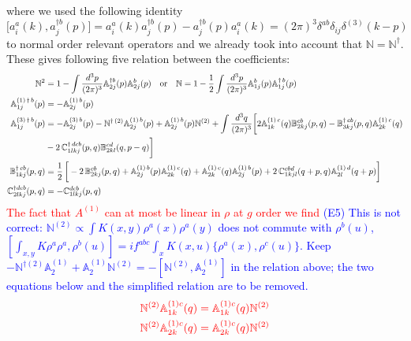 \documentclass[10pt]{article}
\def\mf#1{\mathbb{#1}}
\numberwithin{equation}{section}
\begin{document}
where we used the following identity
\begin{equation}
    \bigg[a^{a}_{i}(k),a^{\dagger b}_{j}(p)\bigg] = a^{a}_{i}(k)a^{\dagger b}_{j}(p) - a^{\dagger b}_{j}(p)a^{a}_{i}(k)= (2\pi)^{3}\delta^{ab}\delta_{ij}\delta^{(3)}(k-p)
\end{equation}
to normal order relevant operators and we  already took into account that $\mf{N} = \mf{N}^\dagger  $. These gives following five relation between the coefficients: 
\begin{align}
 \mf{N}^{2}  &= 1-  \int \frac{d^{3}p}{(2\pi)^{3}} \mf{A}^{\dagger b}_{2j}(p) \mf{A}^{b}_{2j}(p) \quad
 \text{or} \quad \mf{N}   = 1- \frac{1}{2} \int \frac{d^{3}p}{(2\pi)^{3}} \mf{A}^{b}_{1j}(p) \mf{A}^{\dagger\, b}_{1j}(p) \\ 
 \mf{A}^{(1)\, \dagger\,  b}_{1j}(p) & =  -\mf{A}^{(1)\, b}_{2j}(p) \\  
 \mf{A}^{(3)\, \dagger\, b}_{1j}(p) & = -\mf{A}^{(3)\, b}_{2j}(p)- \mf{N}^{\dagger\, (2)}\mf{A}^{(1)\, b}_{2j}(p) + \mf{A}^{(1)\, b}_{2j}(p)\mf{N}^{(2)} +\int \frac{d^{3}q}{(2\pi)^{3}}\bigg[2\mf{A}^{(1)\, c}_{1k}(q)\mf{B}^{cb}_{2kj}(p,q)-\mf{B}^{\dagger\, cb}_{3kj}(p,q)\mf{A}^{(1)\,c}_{2k}(q)\notag \\ & -2\,\mf{C}^{\dagger\, dcb}_{1lkj}(p,q)\mf{B}^{cd}_{2kl}(q,p-q)\bigg] \\ 
 \mf{B}^{\dagger\, cb}_{1kj}(p,q) & = \frac{1}{2}\,\bigg[-2\,\mf{B}^{cb}_{2kj}(p,q)+\mf{A}^{(1)\, b}_{2j}(p)\mf{A}^{(1)\, c}_{2k}(q)+ \mf{A}^{(1)\, c}_{2k}(q)\mf{A}^{(1)\, b}_{2j}(p)+2\, \mf{C}^{cbd}_{1kjl}(q+p,q)\mf{A}^{(1)\,d}_{2l}(q+p)\bigg]
\\ 
  \mf{C}^{\dagger dcb}_{2lkj}(p,q) & =  -\mf{C}^{dcb}_{1lkj}(p,q)
\end{align}
\textcolor{red}{The fact that $A^{(1)}$ can at most be linear in $\rho$ at $g$ order we find} \textcolor{blue}{(E5) This is not correct: $\mf N^{(2)}\propto\int K(x,y)\rho^a(x)\rho^a(y)$ does not commute with $\rho^b(u)$, $[\int_{x,y}K\rho^a\rho^a,\rho^b(u)]=if^{abc}\int_xK(x,u)\{\rho^a(x),\rho^c(u)\}$. Keep $-\mf N^{\dagger(2)}\mf A^{(1)}_{2}+\mf A^{(1)}_{2}\mf N^{(2)}=-[\mf N^{(2)},\mf A^{(1)}_{2}]$ in the relation above; the two equations below and the simplified relation are to be removed.} 
\begin{align}    \color{red}\mf {N}^{(2)}\mf{A}^{(1)c}_{1k}(q) &\color{red}= \mf{A}^{(1) c}_{1k}(q) \mf {N}^{(2)} \\
    \color{red}\mf {N}^{(2)}\mf{A}^{(1)c}_{2k}(q) &\color{red}= \mf{A}^{(1) c}_{2k}(q) \mf {N}^{(2)}
\end{align}
\end{document}
